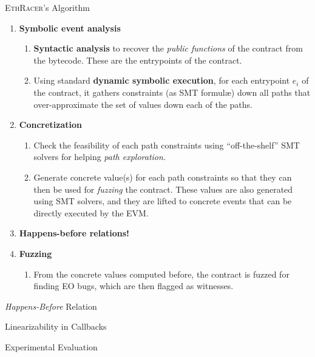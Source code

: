 \documentclass[9pt]{beamer}
\begin{document}
\begin{frame}{\textsc{EthRacer}'s Algorithm}
  \begin{enumerate}
  \item<1-> \textbf{Symbolic event analysis}
    \begin{enumerate}
    \item<4-> \textbf{Syntactic analysis} to recover the \emph{public functions} of the
    contract from the bytecode.  These are the \alert{entrypoints} of the
    contract.
    \item<5-> Using standard \textbf{dynamic symbolic execution}, for each entrypoint
      $e_i$ of the contract, it gathers \alert{constraints} (as SMT formul\ae) down
      all paths that over-approximate the set of values down each of the paths.
    \end{enumerate}
  \item<2-> \textbf{Concretization}
    \begin{enumerate}
    \item<6-> Check the \alert{feasibility} of each path constraints
      using ``off-the-shelf'' SMT solvers for helping \emph{path
        exploration}.
    \item<7-> Generate \alert{concrete} value(s) for each path
      constraints so that they can then be used for \emph{fuzzing} the
      contract.  These values are also generated using SMT solvers,
      and they are lifted to concrete events that can be directly
      executed by the EVM.
    \end{enumerate}
  \item<9-> \alert{\bfseries Happens-before relations!}
  \item<3-> \textbf{Fuzzing}
    \begin{enumerate}
    \item<8-> From the concrete values computed before, the contract
      is \alert{fuzzed} for finding EO bugs, which are then flagged as
      witnesses.
    \end{enumerate}
  \end{enumerate}
\end{frame}
%
\begin{frame}{\textit{Happens-Before} Relation}
\end{frame}
%
\begin{frame}{Linearizability in Callbacks}
\end{frame}
%
\begin{frame}{Experimental Evaluation}
\end{frame}
\end{document}
